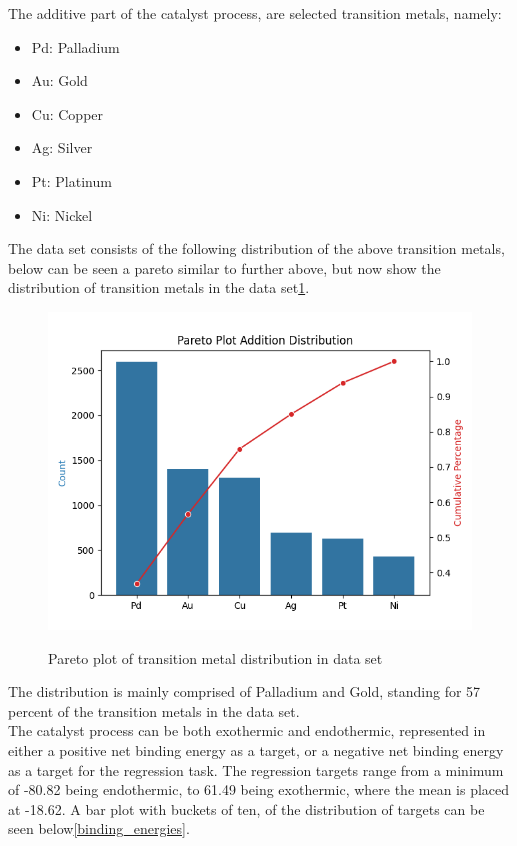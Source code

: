The additive part of the catalyst process, are selected transition metals, namely: 

\begin{itemize}
  \item Pd: Palladium
  \item Au: Gold
  \item Cu: Copper
  \item Ag: Silver
  \item Pt: Platinum
  \item Ni: Nickel
\end{itemize}

The data set consists of the following distribution of the above transition metals, below can be seen a pareto similar to further above, 
but now show the distribution of transition metals in the data set\ref{addition_atoms}.

\begin{figure}[H]
\caption{Pareto plot of transition metal distribution in data set}
\centering\label{addition_atoms}
\includegraphics[width=\textwidth]{Images/Data/addition_distribution.png}
\end{figure}

The distribution is mainly comprised of Palladium and Gold, standing for 57 percent of the transition metals in the data set. \\

The catalyst process can be both exothermic and endothermic, represented in either a positive net binding energy as a target, 
or a negative net binding energy as a target for the regression task. The regression targets range from a minimum of -80.82 
being endothermic, to 61.49 being exothermic, where the mean is placed at -18.62. A bar plot with buckets of ten,
 of the distribution of targets can be seen below\ref{binding_energies}.

